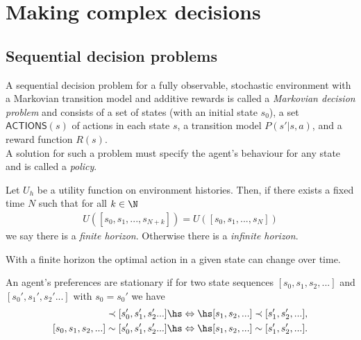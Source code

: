 \documentclass{article}
\begin{document}
\section{Making complex decisions}


\subsection{Sequential decision problems}

\begin{definition}
    A sequential decision problem for a fully observable, stochastic environment
    with a Markovian transition model and additive rewards is called a \emph{Markovian
    decision problem} and consists of a set of states (with an initial state $s_0$), 
    a set $\textsf{ACTIONS}(s)$ of
    actions in each state $s$, a transition model $P(s'|s,a)$, and a reward function
    $R(s)$.\\
    A solution for such a problem must specify the agent's behaviour for any state
    and is called a \emph{policy}.
\end{definition}

\begin{definition}[R\&N p. 648]
    Let $U_h$ be a utility function on environment histories. Then, if there exists
    a fixed time $N$ such that for all $k\in\N$
    \begin{align*}
        U([s_0,s_1,...,s_{N+k}]) = U([s_0,s_1,...,s_N]) 
    \end{align*}
    we say there is a \emph{finite horizon}. Otherwise there is a \emph{infinite
    horizon}.
\end{definition}

\begin{theorem}
    With a finite horizon the optimal action in a given state can change over time.
\end{theorem}

\begin{definition}[R\&N p. 649]
    An agent's preferences are stationary if for two state sequences
    $[s_0, s_1, s_2, ...]$ and $[s_0', s_1', s_2'...]$ with $s_0=s_0'$ we have
    \begin{align*}
        [s_0, s_1, s_2, ...] \prec [s_0', s_1', s_2'...]\hs&\Leftrightarrow\hs
        [s_1, s_2, ...] \prec [s_1', s_2', ...],\\
        [s_0, s_1, s_2, ...] \sim [s_0', s_1', s_2'...]\hs&\Leftrightarrow\hs
        [s_1, s_2, ...] \sim [s_1', s_2', ...].
    \end{align*}
\end{definition}
\end{document}
